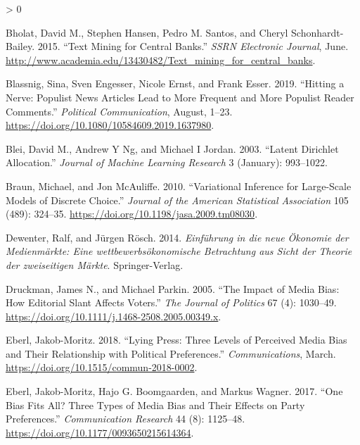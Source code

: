 \documentclass[
]{article}
\newlength{\cslhangindent}
\newenvironment{CSLReferences}[2] %
 {%
  \setlength{\parindent}{0pt}
  \ifodd #1 \everypar{\setlength{\hangindent}{\cslhangindent}}\ignorespaces\fi
  \ifnum #2 > 0
  \setlength{\parskip}{#2\baselineskip}
  \fi
 }%
 {}
\begin{document}
\hypertarget{refs}{}
\begin{CSLReferences}{1}{0}
\leavevmode\hypertarget{ref-bholat_text_2015}{}%
Bholat, David M., Stephen Hansen, Pedro M. Santos, and Cheryl
Schonhardt-Bailey. 2015. {``Text Mining for Central Banks.''}
\emph{{SSRN} Electronic Journal}, June.
\url{http://www.academia.edu/13430482/Text_mining_for_central_banks}.

\leavevmode\hypertarget{ref-blassnig_hitting_2019}{}%
Blassnig, Sina, Sven Engesser, Nicole Ernst, and Frank Esser. 2019.
{``Hitting a Nerve: Populist News Articles Lead to More Frequent and
More Populist Reader Comments.''} \emph{Political Communication},
August, 1--23. \url{https://doi.org/10.1080/10584609.2019.1637980}.

\leavevmode\hypertarget{ref-blei_latent_2003}{}%
Blei, David M., Andrew Y Ng, and Michael I Jordan. 2003. {``Latent
Dirichlet Allocation.''} \emph{Journal of Machine Learning Research} 3
(January): 993--1022.

\leavevmode\hypertarget{ref-braun_variational_2010}{}%
Braun, Michael, and Jon McAuliffe. 2010. {``Variational Inference for
Large-Scale Models of Discrete Choice.''} \emph{Journal of the American
Statistical Association} 105 (489): 324--35.
\url{https://doi.org/10.1198/jasa.2009.tm08030}.

\leavevmode\hypertarget{ref-dewenter_einfuhrung_2014}{}%
Dewenter, Ralf, and Jürgen Rösch. 2014. \emph{Einführung in die neue
Ökonomie der Medienmärkte: Eine wettbewerbsökonomische Betrachtung aus
Sicht der Theorie der zweiseitigen Märkte}. Springer-Verlag.

\leavevmode\hypertarget{ref-druckman_impact_2005}{}%
Druckman, James N., and Michael Parkin. 2005. {``The Impact of Media
Bias: How Editorial Slant Affects Voters.''} \emph{The Journal of
Politics} 67 (4): 1030--49.
\url{https://doi.org/10.1111/j.1468-2508.2005.00349.x}.

\leavevmode\hypertarget{ref-eberl_lying_2018}{}%
Eberl, Jakob-Moritz. 2018. {``Lying Press: Three Levels of Perceived
Media Bias and Their Relationship with Political Preferences.''}
\emph{Communications}, March.
\url{https://doi.org/10.1515/commun-2018-0002}.

\leavevmode\hypertarget{ref-eberl_one_2017}{}%
Eberl, Jakob-Moritz, Hajo G. Boomgaarden, and Markus Wagner. 2017.
{``One Bias Fits All? Three Types of Media Bias and Their Effects on
Party Preferences.''} \emph{Communication Research} 44 (8): 1125--48.
\url{https://doi.org/10.1177/0093650215614364}.


\end{CSLReferences}
\end{document}
